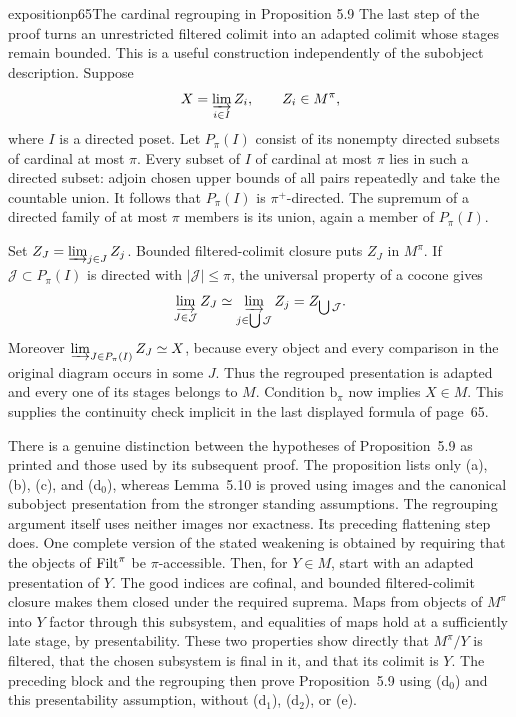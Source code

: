 \begin{dcomment}{exposition}{p65}{The cardinal regrouping in Proposition 5.9}
The last step of the proof turns an unrestricted filtered colimit into an adapted colimit whose stages remain bounded. This is a useful construction independently of the subobject description. Suppose
\[
 X=\varinjlim_{i\in I}Z_i,\qquad Z_i\in M^\pi,
\]
where $I$ is a directed poset. Let $P_\pi(I)$ consist of its nonempty directed subsets of cardinal at most $\pi$. Every subset of $I$ of cardinal at most $\pi$ lies in such a directed subset: adjoin chosen upper bounds of all pairs repeatedly and take the countable union. It follows that $P_\pi(I)$ is $\pi^+$-directed. The supremum of a directed family of at most $\pi$ members is its union, again a member of $P_\pi(I)$.

Set $Z_J=\varinjlim_{j\in J}Z_j$. Bounded filtered-colimit closure puts $Z_J$ in $M^\pi$. If $\mathcal J\subset P_\pi(I)$ is directed with $|\mathcal J|\leq\pi$, the universal property of a cocone gives
\[
 \varinjlim_{J\in\mathcal J}Z_J
 \simeq\varinjlim_{j\in\bigcup\mathcal J}Z_j
 =Z_{\bigcup\mathcal J}.
\]
Moreover $\varinjlim_{J\in P_\pi(I)}Z_J\simeq X$, because every object and every comparison in the original diagram occurs in some $J$. Thus the regrouped presentation is adapted and every one of its stages belongs to $M$. Condition $\mathrm b_\pi$ now implies $X\in M$. This supplies the continuity check implicit in the last displayed formula of page~65.

There is a genuine distinction between the hypotheses of Proposition~5.9 as printed and those used by its subsequent proof. The proposition lists only (a), (b), (c), and (d$_0$), whereas Lemma~5.10 is proved using images and the canonical subobject presentation from the stronger standing assumptions. The regrouping argument itself uses neither images nor exactness. Its preceding flattening step does. One complete version of the stated weakening is obtained by requiring that the objects of $\mathrm{Filt}^\pi$ be $\pi$-accessible. Then, for $Y\in M$, start with an adapted presentation of $Y$. The good indices are cofinal, and bounded filtered-colimit closure makes them closed under the required suprema. Maps from objects of $M^\pi$ into $Y$ factor through this subsystem, and equalities of maps hold at a sufficiently late stage, by presentability. These two properties show directly that $M^\pi/Y$ is filtered, that the chosen subsystem is final in it, and that its colimit is $Y$. The preceding block and the regrouping then prove Proposition~5.9 using (d$_0$) and this presentability assumption, without (d$_1$), (d$_2$), or (e).


\end{dcomment}
